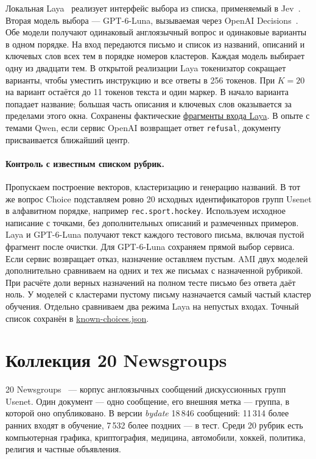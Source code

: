 \documentclass[11pt,a4paper]{article}
\begin{document}
Локальная Laya~\cite{laya} реализует интерфейс выбора из списка, применяемый в Jev~\cite{jev}. Вторая модель выбора --- GPT-6-Luna, вызываемая через OpenAI Decisions~\cite{luna}. Обе модели получают одинаковый англоязычный вопрос и одинаковые варианты в одном порядке. На вход передаются письмо и список из названий, описаний и ключевых слов всех тем в порядке номеров кластеров. Каждая модель выбирает одну из двадцати тем. В открытой реализации Laya токенизатор сокращает варианты, чтобы уместить инструкцию и все ответы в 256 токенов. При $K=20$ на вариант остаётся до 11 токенов текста и один маркер. В начало варианта попадает название; большая часть описания и ключевых слов оказывается за пределами этого окна. Сохранены фактические \href{https://github.com/fanis-khafizov/topicjev-benchmarking/blob/main/results/ng-full/laya-options.csv}{фрагменты входа Laya}. В опыте с темами Qwen, если сервис OpenAI возвращает ответ \texttt{refusal}, документу присваивается ближайший центр. 

\paragraph{Контроль с известным списком рубрик.}
Пропускаем построение векторов, кластеризацию и генерацию названий. В тот же вопрос Choice подставляем ровно 20 исходных идентификаторов групп Usenet в алфавитном порядке, например \texttt{rec.sport.hockey}. Используем исходное написание с точками, без дополнительных описаний и размеченных примеров. Laya и GPT-6-Luna получают текст каждого тестового письма, включая пустой фрагмент после очистки. Для GPT-6-Luna сохраняем прямой выбор сервиса. Если сервис возвращает отказ, назначение оставляем пустым. AMI двух моделей дополнительно сравниваем на одних и тех же письмах с назначенной рубрикой. При расчёте доли верных назначений на полном тесте письмо без ответа даёт ноль. У моделей с кластерами пустому письму назначается самый частый кластер обучения. Отдельно сравниваем два режима Laya на непустых входах. Точный список сохранён в \href{https://github.com/fanis-khafizov/topicjev-benchmarking/blob/main/results/ng-full/known-choices.json}{known-choices.json}.

\section{Коллекция 20 Newsgroups}
20 Newsgroups~\cite{ng} --- корпус англоязычных сообщений дискуссионных групп Usenet. Один документ --- одно сообщение, его внешняя метка --- группа, в которой оно опубликовано. В версии \textit{bydate} 18\,846 сообщений: 11\,314 более ранних входят в обучение, 7\,532 более поздних --- в тест. Среди 20 рубрик есть компьютерная графика, криптография, медицина, автомобили, хоккей, политика, религия и частные объявления.
\end{document}
